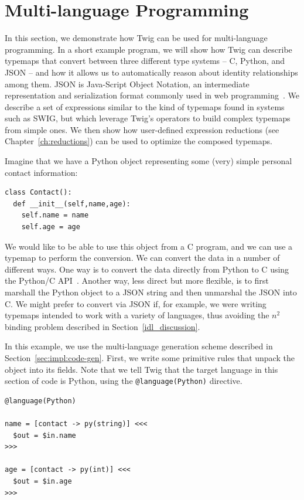 
\section{Multi-language Programming}
\label{sec:eval:multi-lang}

In this section, we demonstrate how Twig can be used for
multi-language programming. In a short example program, we will
show how Twig can describe typemaps that convert between three
different type systems -- C, Python, and JSON -- and how it allows
us to automatically reason about identity relationships among
them. JSON is Java-Script Object Notation, an intermediate
representation and serialization format commonly used in web
programming~\cite{json}. We describe a set of expressions similar
to the kind of typemaps found in systems such as SWIG, but which
leverage Twig's operators to build complex typemaps from simple
ones. We then show how user-defined expression reductions (see
Chapter~\ref{ch:reductions}) can be used to optimize the composed
typemaps.

Imagine that we have a Python object representing some (very)
simple personal contact information:

\begin{verbatim}
class Contact():
  def __init__(self,name,age):
    self.name = name
    self.age = age
\end{verbatim}

We would like to be able to use this object from a C program, and
we can use a typemap to perform the conversion. We can convert the
data in a number of different ways. One way is to convert the data
directly from Python to C using the Python/C
API~\cite{python-c-api}. Another way, less direct but more
flexible, is to first marshall the Python object to a JSON string
and then unmarshal the JSON into C. We might prefer to convert via
JSON if, for example, we were writing typemaps intended to work
with a variety of languages, thus avoiding the $n^2$ binding
problem described in Section~\ref{idl_discussion}.

In this example, we use the multi-language generation scheme
described in Section~\ref{sec:impl:code-gen}. First, we write some
primitive rules that unpack the object into its fields. Note that
we tell Twig that the target language in this section of code is
Python, using the \texttt{@language(Python)} directive.

\begin{verbatim}
@language(Python)

name = [contact -> py(string)] <<<
  $out = $in.name
>>>

age = [contact -> py(int)] <<<
  $out = $in.age
>>>
\end{verbatim}


